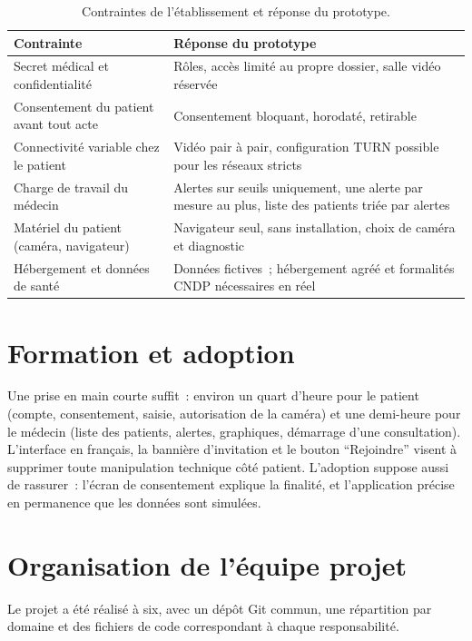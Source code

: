 \begin{table}[H]
\centering
\caption{Contraintes de l'établissement et réponse du prototype.}
\label{tab:contraintes}
\begin{tabularx}{\textwidth}{@{}X X@{}}
\toprule
\textbf{Contrainte} & \textbf{Réponse du prototype} \\
\midrule
Secret médical et confidentialité & Rôles, accès limité au propre dossier, salle vidéo réservée \\
Consentement du patient avant tout acte & Consentement bloquant, horodaté, retirable \\
Connectivité variable chez le patient & Vidéo pair à pair, configuration \ac{TURN} possible pour les réseaux stricts \\
Charge de travail du médecin & Alertes sur seuils uniquement, une alerte par mesure au plus, liste des patients triée par alertes \\
Matériel du patient (caméra, navigateur) & Navigateur seul, sans installation, choix de caméra et diagnostic \\
Hébergement et données de santé & Données fictives~; hébergement agréé et formalités \ac{CNDP} nécessaires en réel \\
\bottomrule
\end{tabularx}
\end{table}

\section{Formation et adoption}

Une prise en main courte suffit~: environ un quart d'heure pour le patient (compte, consentement, saisie, autorisation de la caméra) et une demi-heure pour le médecin (liste des patients, alertes, graphiques, démarrage d'une consultation). L'interface en français, la bannière d'invitation et le bouton \enquote{Rejoindre} visent à supprimer toute manipulation technique côté patient. L'adoption suppose aussi de rassurer~: l'écran de consentement explique la finalité, et l'application précise en permanence que les données sont simulées.

\section{Organisation de l'équipe projet}

Le projet a été réalisé à six, avec un dépôt Git commun, une répartition par domaine et des fichiers de code correspondant à chaque responsabilité.

